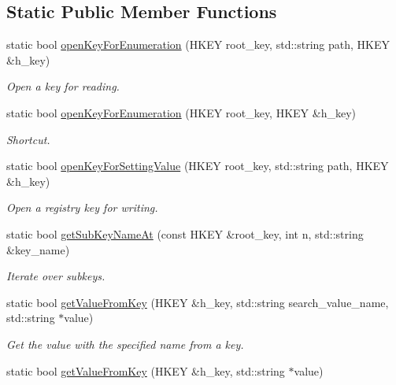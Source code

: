 \subsection*{Static Public Member Functions}
\begin{DoxyCompactItemize}
\item 
static bool \hyperlink{class_direct_registry_access_ae051be8724359399dacc86a38149762c}{open\+Key\+For\+Enumeration} (H\+K\+E\+Y root\+\_\+key, std\+::string path, H\+K\+E\+Y \&h\+\_\+key)
\begin{DoxyCompactList}\small\item\em Open a key for reading. \end{DoxyCompactList}\item 
static bool \hyperlink{class_direct_registry_access_affd3141655ca0d587461282fcab5cc25}{open\+Key\+For\+Enumeration} (H\+K\+E\+Y root\+\_\+key, H\+K\+E\+Y \&h\+\_\+key)
\begin{DoxyCompactList}\small\item\em Shortcut. \end{DoxyCompactList}\item 
static bool \hyperlink{class_direct_registry_access_a3bef2793ed202b4ba02ad9e099785485}{open\+Key\+For\+Setting\+Value} (H\+K\+E\+Y root\+\_\+key, std\+::string path, H\+K\+E\+Y \&h\+\_\+key)
\begin{DoxyCompactList}\small\item\em Open a registry key for writing. \end{DoxyCompactList}\item 
static bool \hyperlink{class_direct_registry_access_aa123bf857d78ceb45ef406535869c6b1}{get\+Sub\+Key\+Name\+At} (const H\+K\+E\+Y \&root\+\_\+key, int n, std\+::string \&key\+\_\+name)
\begin{DoxyCompactList}\small\item\em Iterate over subkeys. \end{DoxyCompactList}\item 
static bool \hyperlink{class_direct_registry_access_a0c4addcf0e776cdecead314ef7427f73}{get\+Value\+From\+Key} (H\+K\+E\+Y \&h\+\_\+key, std\+::string search\+\_\+value\+\_\+name, std\+::string $\ast$value)
\begin{DoxyCompactList}\small\item\em Get the value with the specified name from a key. \end{DoxyCompactList}\item 
static bool \hyperlink{class_direct_registry_access_a47b88eff5dfae4e37ca98b26d62dd12a}{get\+Value\+From\+Key} (H\+K\+E\+Y \&h\+\_\+key, std\+::string $\ast$value)

\end{DoxyCompactItemize}
